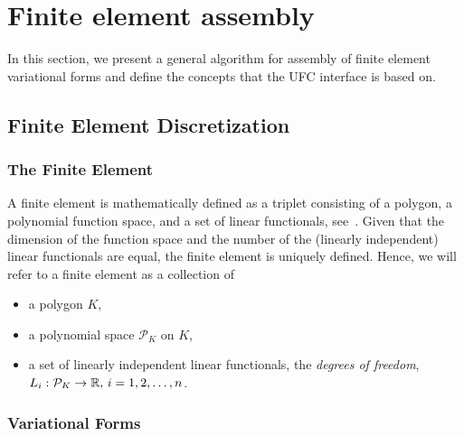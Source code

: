 \chapter{Finite element assembly}
\label{sec:assembly}

\newtheorem{example}{\small{}}[section]

In this section, we present a general algorithm for assembly of finite
element variational forms and define the concepts that the UFC
interface is based on.

\section{Finite Element Discretization}
\label{sec:fem}

\subsection{The Finite Element}

A finite element is mathematically defined as a triplet consisting of
a polygon, a polynomial function space, and a set of linear
functionals, see~\cite{Cia78}. Given that the dimension of the
function space and the number of the (linearly independent) linear
functionals are equal, the finite element is uniquely defined. Hence,
we will refer to a finite element as a collection of
\begin{itemize}
\item a polygon $K$,
\item a polynomial space $\mathcal{P}_K$ on $K$,
\item a set of linearly independent linear functionals, the
\emph{degrees of freedom}, $L_i : \mathcal{P}_K \rightarrow \mathbb{R}, \, i =
1, 2, \ldots, n$.
\end{itemize}

\subsection{Variational Forms}

